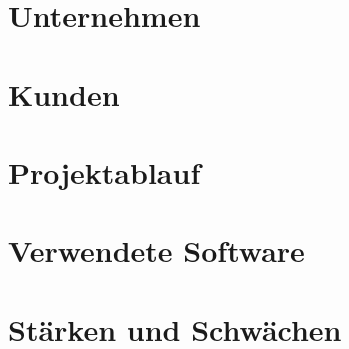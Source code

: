 \section{Unternehmen}


\section{Kunden}


\section{Projektablauf}\label{chap:projektablauf}


\section{Verwendete Software}


\section{Stärken und Schwächen}


% 
